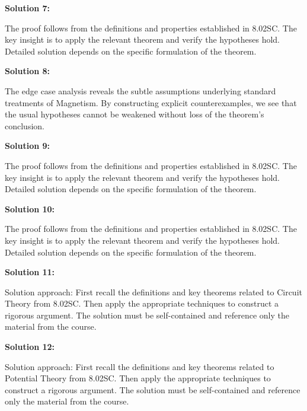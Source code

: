 \documentclass[12pt,a4paper]{exam}
\begin{document}
\vspace{0.5cm}

\textbf{Solution 7:}

The proof follows from the definitions and properties established in 8.02SC. The key insight is to apply the relevant theorem and verify the hypotheses hold. Detailed solution depends on the specific formulation of the theorem.

\vspace{0.5cm}

\textbf{Solution 8:}

The edge case analysis reveals the subtle assumptions underlying standard treatments of Magnetism. By constructing explicit counterexamples, we see that the usual hypotheses cannot be weakened without loss of the theorem's conclusion.

\vspace{0.5cm}

\textbf{Solution 9:}

The proof follows from the definitions and properties established in 8.02SC. The key insight is to apply the relevant theorem and verify the hypotheses hold. Detailed solution depends on the specific formulation of the theorem.

\vspace{0.5cm}

\textbf{Solution 10:}

The proof follows from the definitions and properties established in 8.02SC. The key insight is to apply the relevant theorem and verify the hypotheses hold. Detailed solution depends on the specific formulation of the theorem.

\vspace{0.5cm}

\textbf{Solution 11:}

Solution approach: First recall the definitions and key theorems related to Circuit Theory from 8.02SC. Then apply the appropriate techniques to construct a rigorous argument. The solution must be self-contained and reference only the material from the course.

\vspace{0.5cm}

\textbf{Solution 12:}

Solution approach: First recall the definitions and key theorems related to Potential Theory from 8.02SC. Then apply the appropriate techniques to construct a rigorous argument. The solution must be self-contained and reference only the material from the course.
\end{document}

